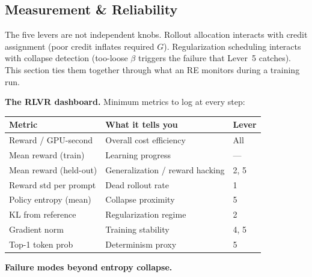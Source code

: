 \subsection{Measurement \& Reliability}

The five levers are not independent knobs. Rollout allocation interacts with credit assignment (poor credit inflates required $G$). Regularization scheduling interacts with collapse detection (too-loose $\beta$ triggers the failure that Lever~5 catches). This section ties them together through what an RE monitors during a training run.

\textbf{The RLVR dashboard.} Minimum metrics to log at every step:

\begin{table}[h]
\centering
\small
\begin{tabular}{@{}lll@{}}
\toprule
\textbf{Metric} & \textbf{What it tells you} & \textbf{Lever} \\
\midrule
Reward / GPU-second    & Overall cost efficiency        & All \\
Mean reward (train)    & Learning progress              & --- \\
Mean reward (held-out) & Generalization / reward hacking & 2, 5 \\
Reward std per prompt  & Dead rollout rate              & 1 \\
Policy entropy (mean)  & Collapse proximity             & 5 \\
KL from reference      & Regularization regime          & 2 \\
Gradient norm          & Training stability             & 4, 5 \\
Top-1 token prob       & Determinism proxy              & 5 \\
\bottomrule
\end{tabular}
\end{table}

\textbf{Failure modes beyond entropy collapse.}

